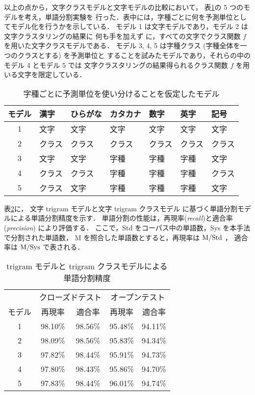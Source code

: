 以上の点から，文字クラスモデルと文字モデルの比較において，
表\ref{Tab:ClusteringCondition}の 5 つのモデルを考え，単語分割実験を
行った．表中には，字種ごとに何を予測単位としてモデル化を行うかを示している．
モデル 1 は文字モデルであり，モデル 2 は文字クラスタリングの結果に
何も手を加えず
に，すべての文字でクラス関数 $f$ を用いた文字クラスモデルである．
モデル 3, 4, 5 は字種クラス
(字種全体を一つのクラスとする) を予測単位と
することを試みたモデルであり，それらの中のモデル 4 とモデル 5 では
文字クラスタリングの結果得られるクラス関数 $f$ を用いる文字を限定している．
\begin{table}[hbt]
\begin{center}
\caption{字種ごとに予測単位を使い分けることを仮定したモデル}
\label{Tab:ClusteringCondition}
{\tabcolsep 1.5mm
\begin{tabular}{c||llllll}
\hline
\hline
モデル & 漢字 & ひらがな & カタカナ & 数字 & 英字 & 記号\\
\hline
1 & 文字 & 文字 & 文字 & 文字 & 文字 & 文字\\
\hline
2 & クラス & クラス & クラス & クラス & クラス & クラス\\
\hline
3 & 文字 & 文字 & 字種 & 字種 & 字種 & 文字\\
\hline
4 & クラス & クラス & 字種 & 字種 & 字種 & クラス\\
\hline
5 & クラス & 文字 & 字種 & 字種 & 字種 & 文字\\
\hline
\end{tabular}
}
\end{center}
\end{table}
\vspace{-2mm}


表\ref{Tab:PerformanceTrigram}に，
文字 trigram モデルと文字 trigram クラスモデル
に基づく単語分割モデルによる単語分割精度を示す．
単語分割の性能は，再現率({\it recall})と適合率({\it precision})
により評価する\cite{Nagata94}．
ここで，Std をコーパス中の単語数，Sys を本手法で分割された単語数，
M を照合した単語数とすると，再現率は ${\rm M}/{\rm Std}$ ，
適合率は ${\rm M}/{\rm Sys}$ で表される．
\begin{table}[hbt]
\begin{center}
\caption{trigram モデルと trigram クラスモデルによる単語分割精度}
\label{Tab:PerformanceTrigram}
{\tabcolsep 1.5mm
\begin{tabular}{c||c|c|c|c}
\hline
\hline
 & \multicolumn{2}{|c|}{クローズドテスト} & \multicolumn{2}{c}{オープンテスト}\\
\cline{2-5}
モデル & 再現率 & 適合率 & 再現率 & 適合率\\
\hline
1 & 98.10\% & 98.56\% & 95.48\% & 94.11\%\\
2 & 98.09\% & 98.56\% & 95.83\% & 94.34\%\\
3 & 97.82\% & 98.44\% & 95.91\% & 94.73\%\\
4 & 97.80\% & 98.43\% & 95.86\% & 94.70\%\\
5 & 97.83\% & 98.44\% & 96.01\% & 94.74\%\\
\hline
\end{tabular}
}
\end{center}
\end{table}

